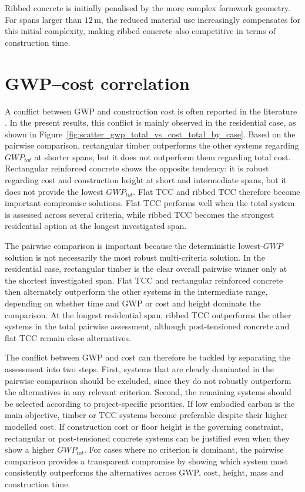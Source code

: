Ribbed concrete is initially penalised by the more complex formwork geometry. For spans larger than \(12\,\mathrm{m}\), the reduced material use increasingly compensates for this initial complexity, making ribbed concrete also competitive in terms of construction time.

\newpage
\section{GWP--cost correlation}
\label{sec:gwp_cost_relationship}

A conflict between GWP and construction cost is often reported in the literature \cite{Ammann2024}. In the present results, this conflict is mainly observed in the residential case, as shown in Figure~\ref{fig:scatter_gwp_total_vs_cost_total_by_case}. Based on the pairwise comparison, rectangular timber outperforms the other systems regarding \(GWP_{tot}\) at shorter spans, but it does not outperform them regarding total cost. Rectangular reinforced concrete shows the opposite tendency: it is robust regarding cost and construction height at short and intermediate spans, but it does not provide the lowest \(GWP_{tot}\). Flat TCC and ribbed TCC therefore become important compromise solutions. Flat TCC performs well when the total system is assessed across several criteria, while ribbed TCC becomes the strongest residential option at the longest investigated span.

The pairwise comparison is important because the deterministic lowest-\(GWP\) solution is not necessarily the most robust multi-criteria solution. In the residential case, rectangular timber is the clear overall pairwise winner only at the shortest investigated span. Flat TCC and rectangular reinforced concrete then alternately outperform the other systems in the intermediate range, depending on whether time and GWP or cost and height dominate the comparison. At the longest residential span, ribbed TCC outperforms the other systems in the total pairwise assessment, although post-tensioned concrete and flat TCC remain close alternatives.

The conflict between GWP and cost can therefore be tackled by separating the assessment into two steps. First, systems that are clearly dominated in the pairwise comparison should be excluded, since they do not robustly outperform the alternatives in any relevant criterion. Second, the remaining systems should be selected according to project-specific priorities. If low embodied carbon is the main objective, timber or TCC systems become preferable despite their higher modelled cost. If construction cost or floor height is the governing constraint, rectangular or post-tensioned concrete systems can be justified even when they show a higher \(GWP_{tot}\). For cases where no criterion is dominant, the pairwise comparison provides a transparent compromise by showing which system most consistently outperforms the alternatives across GWP, cost, height, mass and construction time.

